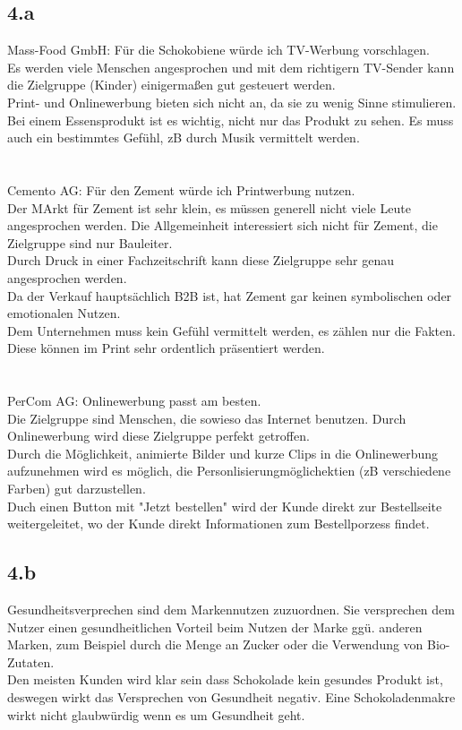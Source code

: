 \subsection{4.a}
    Mass-Food GmbH: Für die Schokobiene würde ich TV-Werbung vorschlagen. \\
    Es werden viele Menschen angesprochen und mit dem richtigern TV-Sender kann die Zielgruppe (Kinder) einigermaßen gut gesteuert werden. \\
    Print- und Onlinewerbung bieten sich nicht an, da sie zu wenig Sinne stimulieren. \\
    Bei einem Essensprodukt ist es wichtig, nicht nur das Produkt zu sehen. Es muss auch ein bestimmtes Gefühl, zB durch Musik vermittelt werden. \\
    \ \\
    \ \\
    Cemento AG: Für den Zement würde ich Printwerbung nutzen. \\
    Der MArkt für Zement ist sehr klein, es müssen generell nicht viele Leute angesprochen werden. Die Allgemeinheit interessiert sich nicht für Zement, die Zielgruppe sind nur Bauleiter. \\
    Durch Druck in einer Fachzeitschrift kann diese Zielgruppe sehr genau angesprochen werden. \\
    Da der Verkauf hauptsächlich B2B ist, hat Zement gar keinen symbolischen oder emotionalen Nutzen. \\
    Dem Unternehmen muss kein Gefühl vermittelt werden, es zählen nur die Fakten. Diese können im Print sehr ordentlich präsentiert werden. \\
    \ \\
    \ \\
    PerCom AG: Onlinewerbung passt am besten. \\
    Die Zielgruppe sind Menschen, die sowieso das Internet benutzen. Durch Onlinewerbung wird diese Zielgruppe perfekt getroffen. \\
    Durch die Möglichkeit, animierte Bilder und kurze Clips in die Onlinewerbung aufzunehmen wird es möglich, die Personlisierungmöglichektien (zB verschiedene Farben) gut darzustellen. \\
    Duch einen Button mit "Jetzt bestellen" wird der Kunde direkt zur Bestellseite weitergeleitet, wo der Kunde direkt Informationen zum Bestellporzess findet. \\

\subsection{4.b}
    Gesundheitsverprechen sind dem Markennutzen zuzuordnen. Sie versprechen dem Nutzer einen gesundheitlichen Vorteil beim Nutzen der Marke ggü. anderen Marken, zum Beispiel durch die Menge an Zucker oder die Verwendung von Bio-Zutaten. \\
    Den meisten Kunden wird klar sein dass Schokolade kein gesundes Produkt ist, deswegen wirkt das Versprechen von Gesundheit negativ. Eine Schokoladenmakre wirkt nicht glaubwürdig wenn es um Gesundheit geht.